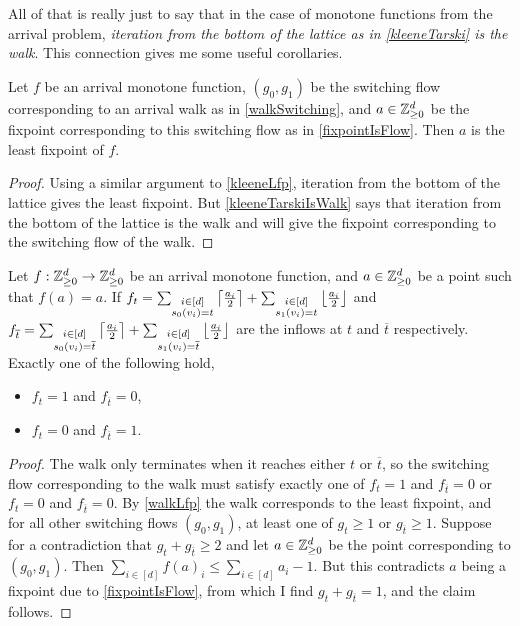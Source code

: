  All of that is really just to say that in the case of monotone functions from the arrival problem,
  \emph{iteration from the bottom of the lattice as in \cref{kleeneTarski} is the walk}. This connection gives
  me some useful corollaries.
  \begin{cor}\label{walkLfp}
    Let $f$ be an arrival monotone function, 
    $(g_0, g_1)$ be the switching flow corresponding to an arrival walk as in \cref{walkSwitching},
    and $a \in \mathbb{Z}_{\geq 0}^d$ be the fixpoint corresponding to this switching flow as in \cref{fixpointIsFlow}.
    Then $a$ is the least fixpoint of $f$.
  \end{cor}
  \begin{proof}
    Using a similar argument to \cref{kleeneLfp}, iteration from the bottom of the lattice gives the least
    fixpoint. But \cref{kleeneTarskiIsWalk} says that iteration from the bottom of the lattice is the walk
    and will give the fixpoint corresponding to the switching flow of the walk.
  \end{proof}
  \begin{cor}
    Let $f : \mathbb{Z}_{\geq 0}^d \to \mathbb{Z}_{\geq 0}^d$ be an arrival monotone function, and $a \in \mathbb{Z}_{\geq 0}^d$ be a point
    such that $f(a) = a$. If 
    $f_t = \sum_{\substack{i \in [d] \\ s_0(v_i) = t}}  \left\lceil \frac{a_i}{2} \right\rceil +
    \sum_{\substack{i \in [d] \\ s_1(v_i) = t}}  \left\lfloor \frac{a_i}{2} \right\rfloor$ and
    $f_{\overline{t}} = \sum_{\substack{i \in [d] \\ s_0(v_i) = \overline{t}}}  \left\lceil \frac{a_i}{2} \right\rceil +
    \sum_{\substack{i \in [d] \\ s_1(v_i) = \overline{t}}}  \left\lfloor \frac{a_i}{2} \right\rfloor$ are the inflows at $t$ and $\overline{t}$
    respectively. Exactly one of the following hold,
    \begin{itemize}
      \item $f_t = 1$ and $f_{\overline{t}} = 0$,
      \item $f_t = 0$ and $f_{\overline{t}} = 1$.
    \end{itemize}
  \end{cor}
  \begin{proof}
    The walk only terminates when it reaches either $t$ or $\overline{t}$, so the switching flow corresponding
    to the walk must satisfy exactly one of $f_t = 1$ and $f_{\overline{t}} = 0$ or 
    $f_t = 0$ and $f_{\overline{t}} = 0$. By \cref{walkLfp} the walk corresponds
    to the least fixpoint, and for all other switching flows $(g_0, g_1)$, at least one of $g_t \geq 1$ or
    $g_{\overline{t}} \geq 1$. Suppose for a contradiction that $g_t + g_{\overline{t}} \geq 2$ and let
    $a \in \mathbb{Z}_{\geq 0}^d$ be the point corresponding to $(g_0, g_1)$. Then
    $\sum_{i \in [d]} f(a)_i \leq \sum_{i \in [d]} a_i - 1$. But this contradicts $a$ being a fixpoint due to
    \cref{fixpointIsFlow}, from which I find $g_t + g_{\overline{t}} = 1$, and the claim follows.
  \end{proof}
